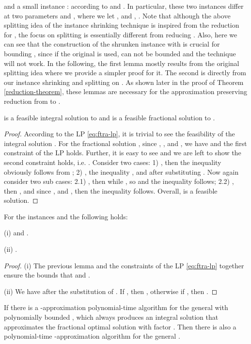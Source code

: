 \documentclass[10pt]{llncs}
\begin{document}
and a small instance : 
according to 
and . In particular,
these two instances differ at two parameters  and
, where we let ,
 and , .
Note that although the above splitting idea of the instance shrinking
technique is inspired from the reduction for , the
focus on splitting  is essentially different from reducing
. Also, here we can see that the construction of the shrunken
instance  with 
is crucial for bounding , since if the original 
is used,  can not be bounded and the technique will not
work. In the following, the first lemma mostly results from the original
splitting idea where we provide a simpler proof for it. The second
is directly from our instance shrinking and splitting on .
As shown later in the proof of Theorem \ref{reduction-theorem}, these
lemmas are necessary for the approximation preserving reduction from
 to .
\begin{lemma}
 is a feasible
integral solution to  and 
is a feasible fractional solution to .\label{lem:splitting}\end{lemma}
\begin{proof}
According to the LP \eqref{eq:ftra-lp}, it is trivial to see the
feasibility of the integral solution .
For the fractional solution ,
since , ,
 and ,
we have  and the first
constraint of the LP holds. Further, it is easy to see 
and we are left to show the second constraint 
holds, i.e. .
Consider two cases: 1) ,
then the inequality obviously follows from ;
2) , the inequality
, and 
after substituting . Now again consider two sub cases:
2.1) , then 
while , so  and the inequality follows; 2.2)
, then ,
and since , 
and , then the inequality follows. Overall, 
is a feasible solution.\end{proof}
\begin{lemma}
For the instances  and  the following
holds: \label{lem: ss-bounds}

\textup{(i)} 
and .

\textup{(ii)} .\end{lemma}
\begin{proof}
(i) The previous lemma and the constraints of the LP \eqref{eq:ftra-lp}
together ensure the bounds that 
and .

(ii) We have 
after the substitution of . If ,
then ,
otherwise if , then .\end{proof}
\begin{theorem}
If there is a -approximation polynomial-time algorithm 
for the general  with polynomially bounded , which
always produces an integral solution that approximates the fractional
optimal solution with factor . Then there is also a polynomial-time
-approximation algorithm  for the general .\label{reduction-theorem}\end{theorem}
\end{document}
